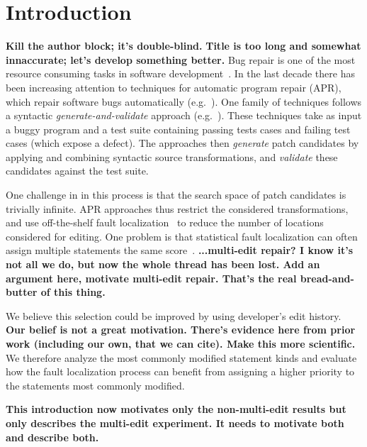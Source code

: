 \documentclass[sigconf]{acmart}
\newcommand{\todo}[1]
  {{\scriptsize \textbf{\color{red} {#1}}}}
\begin{document}

\maketitle

\section{Introduction}
\todo{Kill the author block; it's double-blind.}
\todo{Title is too long and somewhat innaccurate; let's develop something better.}
Bug repair is one of the most resource consuming tasks in 
software development~\cite{Weiss07,Tassey02,Britton13}.
In the last decade there has been increasing attention to 
techniques for automatic program repair (APR), which 
repair software bugs
automatically (e.g.~\cite{legoues12,kim2013,Weimer13,long16proph}).
One family of techniques follows a syntactic \emph{generate-and-validate}
approach (e.g.~\cite{legoues12,kim2013,Qi13TrpAutoR,xuan16}). These techniques
take as input a buggy program and a test suite containing
passing tests cases and failing test cases (which expose a defect).
The approaches then \emph{generate} 
patch candidates by applying and combining syntactic source transformations, and \emph{validate} these 
candidates against the test suite.

One challenge in in this process is that the search space
of patch candidates is trivially infinite.  APR approaches thus restrict the
considered transformations, and use off-the-shelf fault
localization~\cite{example} to reduce the number of locations considered for
editing. One problem is that 
statistical fault localization can often assign multiple statements
the same score~\cite{ref}.  \todo{...multi-edit repair? I know it's not all we
  do, but now the whole thread has been lost.  Add an argument here, motivate
  multi-edit repair.  That's the real bread-and-butter of this thing.}


We believe this selection could be improved by using
developer's
edit history. \todo{Our belief is not a great motivation.  There's evidence here
  from prior work (including our own, that we can cite).  Make this more
  scientific.} We therefore analyze the most commonly 
modified statement kinds and evaluate how the 
fault localization process can benefit from assigning
a higher priority to the statements most commonly modified.

\todo{This introduction now motivates only the non-multi-edit results but only
  describes the multi-edit experiment.  It needs to motivate both and describe
  both.}
\end{document}
